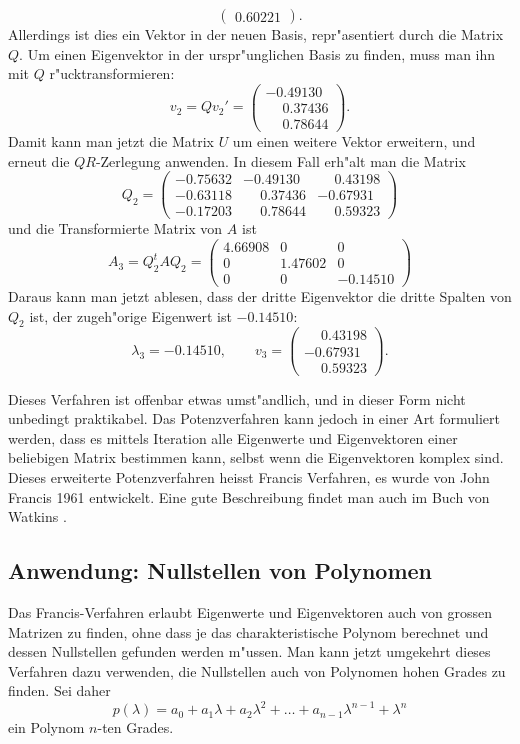 \begin{beispiel}
\[\begin{pmatrix}
   0.60221
\end{pmatrix}.
\]
Allerdings ist dies ein Vektor in der neuen Basis, repr"asentiert durch
die Matrix $Q$.
Um einen Eigenvektor in der urspr"unglichen Basis zu finden, muss man ihn
mit $Q$ r"ucktransformieren:
\[
v_2=Qv_2'=\begin{pmatrix}
          -0.49130\\
\phantom{-}0.37436\\
\phantom{-}0.78644
\end{pmatrix}.
\]
Damit kann man jetzt die Matrix $U$ um einen weitere Vektor erweitern,
und erneut die $QR$-Zerlegung anwenden. In diesem Fall erh"alt man die
Matrix
\[
Q_2=\begin{pmatrix}
-0.75632&          -0.49130&\phantom{-}0.43198\\
-0.63118&\phantom{-}0.37436&          -0.67931\\
-0.17203&\phantom{-}0.78644&\phantom{-}0.59323
\end{pmatrix}
\]
und die Transformierte Matrix von $A$ ist
\[
A_3 = Q_2^tAQ_2=\begin{pmatrix}
   4.66908 & 0       & 0      \\
   0       & 1.47602 & 0      \\
   0       & 0       &-0.14510
\end{pmatrix}
\]
Daraus kann man jetzt ablesen, dass der dritte Eigenvektor
die dritte Spalten von $Q_2$ ist, der zugeh"orige Eigenwert ist
$-0.14510$:
\[
\lambda_3 = -0.14510,\qquad
v_3=
\begin{pmatrix}
\phantom{-}0.43198\\
          -0.67931\\
\phantom{-}0.59323
\end{pmatrix}.
\]
\end{beispiel}

Dieses Verfahren ist offenbar etwas umst"andlich, und
in dieser Form nicht unbedingt praktikabel.
Das Potenzverfahren kann jedoch in einer Art formuliert werden, dass
es mittels Iteration alle Eigenwerte und Eigenvektoren einer beliebigen
Matrix bestimmen kann, selbst wenn die Eigenvektoren komplex sind.
Dieses erweiterte Potenzverfahren heisst Francis Verfahren, es
wurde von John Francis 1961 entwickelt.
Eine gute Beschreibung findet man auch im Buch von Watkins
\cite[Chapter 5]{skript:watkins}.

\subsection{Anwendung: Nullstellen von Polynomen}
Das Francis-Verfahren erlaubt Eigenwerte und Eigenvektoren auch
von grossen Matrizen zu finden, ohne dass je das charakteristische
Polynom berechnet und dessen Nullstellen gefunden werden m"ussen.
Man kann jetzt umgekehrt dieses Verfahren dazu verwenden, die Nullstellen
auch von Polynomen hohen Grades zu finden. Sei daher
\begin{equation}
p(\lambda)=a_0+a_1\lambda+a_2\lambda^2+\dots + a_{n-1}\lambda^{n-1}+\lambda^n
\label{polynomnullstellen:p}
\end{equation}
ein Polynom $n$-ten Grades.

